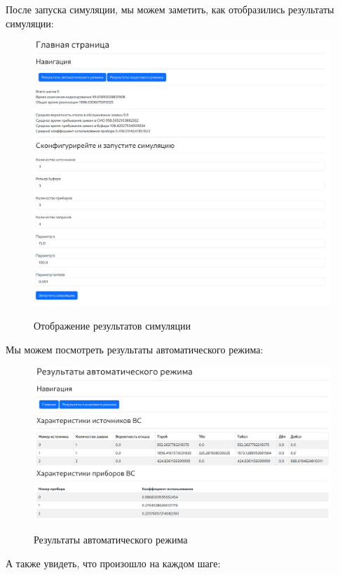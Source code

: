 \documentclass[a4paper, 14pt]{article}
\begin{document}
После запуска симуляции, мы можем заметить, как отобразились результаты симуляции:

\begin{figure}[H]
	\centering
	\includegraphics[width=15cm]{screenshots/2.png}\\
	\caption{Отображение результатов симуляции}
\end{figure}

Мы можем посмотреть результаты автоматического режима:

\begin{figure}[H]
	\centering
	\includegraphics[width=15cm]{screenshots/3.png}\\
	\caption{Результаты автоматического режима}
\end{figure}

А также увидеть, что произошло на каждом шаге:
\end{document}
